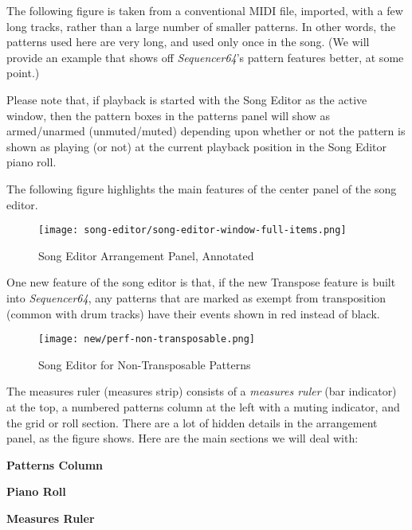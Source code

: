    The following figure is taken from a conventional MIDI file, imported,
   with a few long tracks, rather than a large number of smaller patterns.
   In other words, the patterns used here are very long, and used only once
   in the song.
   (We will provide an example that shows off \textsl{Sequencer64}'s
   pattern features better, at some point.)

   Please note that, if playback is started with the Song Editor as the
   active window, then the pattern boxes in the patterns panel will
   show as armed/unarmed (unmuted/muted) depending upon whether or not the
   pattern is shown as playing (or not) at the current playback position in
   the Song Editor piano roll.

   The following figure highlights the main features of the center panel of the
   song editor.

\begin{figure}[H]
   \centering 
   \texttt{[image: song-editor/song-editor-window-full-items.png]}
   \caption{Song Editor Arrangement Panel, Annotated}
   \label{fig:song_editor_window_full_items}
\end{figure}

   One new feature of the song editor is that, if the new Transpose feature is
   built into \textsl{Sequencer64}, any patterns that are marked as exempt from
   transposition (common with drum tracks) have their events shown in red
   instead of black.

\begin{figure}[H]
   \centering 
   \texttt{[image: new/perf-non-transposable.png]}
   \caption{Song Editor for Non-Transposable Patterns}
   \label{fig:song_editor_non_transposable_items}
\end{figure}

   The measures ruler (measures strip)
   consists of a \textsl{measures ruler} (bar indicator) at the top, a
   numbered patterns column at the left with a muting indicator, and the
   grid or roll section.  There are a lot of hidden details in the
   arrangement panel, as the figure shows.  Here are the main sections we
   will deal with:

   \begin{enumber}
      \item \textbf{Patterns Column}
      \item \textbf{Piano Roll}
      \item \textbf{Measures Ruler}
   \end{enumber}

